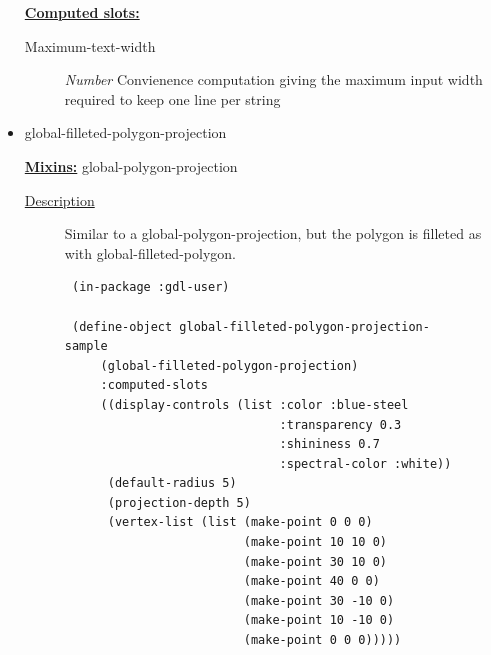 \documentclass [11pt]{book}
\begin{document}
\begin{itemize}
\begin{description}
\end{description}






\textbf{
\underline{Computed slots:}}

\begin{description}

\item [Maximum-text-width]
\emph{Number} Convienence computation giving the maximum input width required to keep one line per string


\end{description}







\item {}global-filleted-polygon-projection


\textbf{
\underline{Mixins:}} global-polygon-projection





\begin{description}

\item [
\underline{Description}]


Similar to a global-polygon-projection, but the polygon is filleted
as with global-filleted-polygon.



\end{description}




\begin{figure}
\begin{lrbox}{\boxedverb}
\begin{minipage}{\linewidth}
{\small

\begin{verbatim}
 (in-package :gdl-user)

 (define-object global-filleted-polygon-projection-sample 
     (global-filleted-polygon-projection)
     :computed-slots
     ((display-controls (list :color :blue-steel 
                              :transparency 0.3 
                              :shininess 0.7 
                              :spectral-color :white))
      (default-radius 5)
      (projection-depth 5)
      (vertex-list (list (make-point 0 0 0)
                         (make-point 10 10 0)
                         (make-point 30 10 0)
                         (make-point 40 0 0)
                         (make-point 30 -10 0)
                         (make-point 10 -10 0)
                         (make-point 0 0 0)))))


\end{verbatim}}
\end{minipage}
\end{lrbox}
\end{figure}
\end{itemize}
\end{document}
